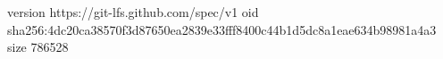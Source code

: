 version https://git-lfs.github.com/spec/v1
oid sha256:4dc20ca38570f3d87650ea2839e33fff8400c44b1d5dc8a1eae634b98981a4a3
size 786528
